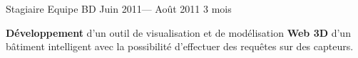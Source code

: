 \jobposition%
{Stagiaire}%
{Equipe BD}
{Juin 2011--- Août 2011}%
{3 mois}%
{
	\textbf{Développement} d’un outil de visualisation et de
	modélisation \textbf{Web 3D} d’un bâtiment intelligent avec la
	possibilité d’effectuer des requêtes sur des capteurs.
	\vspace{0.5em}

}
